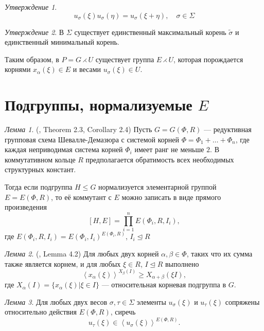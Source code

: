 \documentclass[15pt]{article}
\theoremstyle{remark}
\newtheorem{prop}{Утверждение}
\newtheorem{lm}{Лемма}
\renewcommand{\le}{\leqslant}
\renewcommand{\ge}{\geqslant}
\begin{document}
\begin{prop}
  $$ u_\sigma(\xi) u_\sigma(\eta) = u_\sigma(\xi + \eta), \quad \sigma \in \Sigma $$
\end{prop}

\begin{prop}
  В $\Sigma$ существует единственный максимальный корень $\widetilde{\sigma}$ и единственный минимальный корень.
\end{prop}

Таким образом, в $P = G \rightthreetimes U $ существует группа $E \rightthreetimes U$, которая порождается корнями $x_\alpha(\xi) \in E$ и весами $u_\sigma(\xi) \in U$.

\section{Подгруппы, нормализуемые $E$}

\begin{lm}(\citep{Stavrova2009}, Theorem 2.3, Corollary 2.4)
  \label{directproduct}
  Пусть $G = G(\Phi, R)$ --- редуктивная групповая схема Шевалле-Демазюра
  с системой корней $\Phi = \Phi_1 + \ldots + \Phi_n$, где каждая неприводимая система корней $\Phi_i$ имеет ранг не меньше $2$. В коммутативном кольце $R$ предполагается обратимость всех необходимых структурных констант.
  
  Тогда если подгруппа $H \le G$ нормализуется элементарной группой $E = E(\Phi,R)$, то её коммутант с $E$ можно записать в виде прямого произведения
  $$ [H, E] = \prod_{i=1}^n E(\Phi_i,R,I_i), $$
  где $E(\Phi_i,R,I_i) = E(\Phi_i,I_i)^{E(\Phi_i,R)}$, $I_i \trianglelefteq R$
\end{lm}

\begin{lm}(\citep{Stavrova2009}, Lemma 4.2)
  \label{transitivity}
  Для любых двух корней $\alpha, \beta \in \Phi$, таких что их сумма также является корнем, и для любых  $\xi \in R$, $I \trianglelefteq R$ выполнено
  $$ \left< x_\alpha(\xi) \right>^{X_\beta(I)} \ge X_{\alpha + \beta}(\xi I), $$  
  где $X_\alpha(I) = \{x_\alpha(\xi) | \xi \in I\}$ --- относительная корневая подгруппа в $G$.
\end{lm}

\begin{lm}\label{unipotenttransitivity}
  Для любых двух весов $\sigma, \tau \in \Sigma$ элементы $u_\sigma(\xi)$ и $u_\tau(\xi)$ сопряжены относительно действия $E(\Phi,R)$, сиречь  
  $$ u_\tau(\xi) \in \left<u_\sigma(\xi)\right>^{E(\Phi,R)}. $$
\end{lm}
\end{document}
